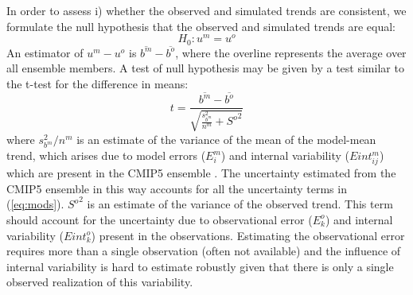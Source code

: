 \documentclass{ametsoc}
\begin{document}
In order to assess i) whether the observed and simulated trends are consistent, we formulate 
the null hypothesis that the observed and simulated trends are equal:
\begin{equation}
H_0 : u^m = u^o
\end{equation}
An estimator of $u^m - u^o$ is $\overline{b^m} - \overline{b^o}$, 
where the overline represents the average over all ensemble members.
A test of null hypothesis may be given by a test similar to the t-test
for the difference in means:
\begin{equation} \label{eq:ttest}
t = \frac{\overline{b^m} - \overline{b^o}}{\sqrt{\frac{s_{b^m}^2}{n^m} + {S^o}^2}}
\end{equation} 
where $s_{b^m}^2/n^m$ is an estimate of the variance of the mean of the model-mean trend,
which arises due to model errors ($E^m_i$) and internal variability ($Eint^m_{ij}$) which
are present in the CMIP5 ensemble \citep{Santer_et_al_2008}. The uncertainty estimated from 
the CMIP5 ensemble in this
way accounts for all the uncertainty terms in (\ref{eq:mods}). ${S^o}^2$ is an 
estimate of the variance of the observed trend. This term should account
for the uncertainty due to observational error ($E^o_k$) and internal 
variability ($Eint^o_k$) present in the observations. Estimating the observational error
requires more than a single observation (often not available) and the influence of 
internal variability is hard to estimate robustly given that there is only a single 
observed realization of this variability. 
\end{document}
